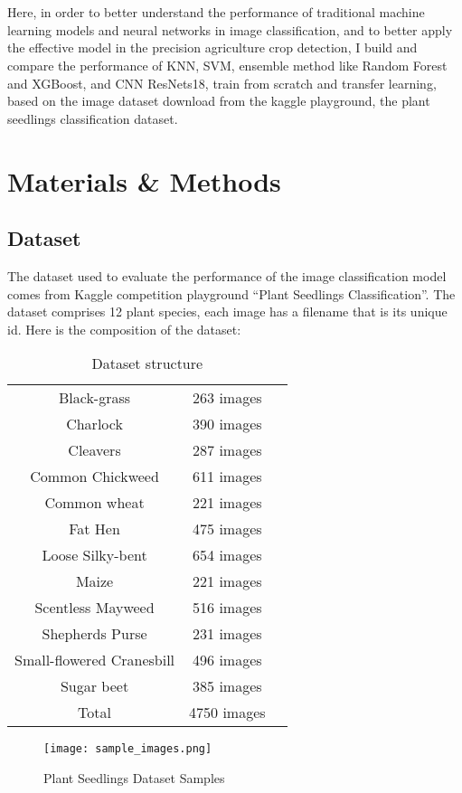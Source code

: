 \documentclass[12pt]{article}
\begin{document}
\\
\\
Here, in order to better understand the performance of traditional machine learning models and neural networks in image classification, and to better apply the effective model in the precision agriculture crop detection, I build and compare the performance of KNN, SVM, ensemble method like Random Forest and XGBoost, and CNN ResNets18, train from scratch and transfer learning, based on the image dataset download from the kaggle playground, the plant seedlings classification dataset. 

\section{Materials \& Methods}
\subsection{Dataset}
The dataset used to evaluate the performance of the image classification model comes from Kaggle competition playground ``Plant Seedlings Classification''. The dataset comprises 12 plant species, each image has a filename that is its unique id. Here is the composition of the dataset:

\begin{table}[h]
\centering
\begin{tabular}{ccc}
\hline
Black-grass&263 images\\
Charlock&390 images\\
Cleavers&287 images\\
Common Chickweed&611 images\\
Common wheat&221 images\\
Fat Hen&475 images\\
Loose Silky-bent&654 images\\
Maize&221 images\\
Scentless Mayweed&516 images\\
Shepherds Purse&231 images\\
Small-flowered Cranesbill&496 images\\
Sugar beet&385 images\\
\hline
Total&4750 images\\
\hline
\end{tabular}
\caption{Dataset structure}
\end{table}

\begin{center}
\begin{figure}[htb]
\centering 
\texttt{[image: sample\_images.png]}
\caption{Plant Seedlings Dataset Samples}
\end{figure}
\end{center}
\end{document}
